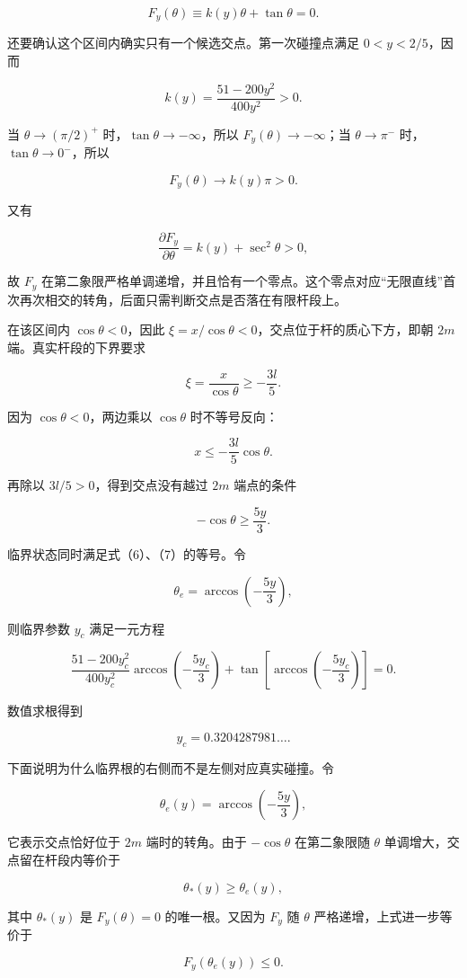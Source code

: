 \documentclass[12pt,a4paper,UTF8]{ctexart}
\begin{document}
\[F_y(\theta)\equiv k(y)\theta+\tan\theta=0. \tag{6}\]

还要确认这个区间内确实只有一个候选交点。第一次碰撞点满足
\(0<y<2/5\)，因而

\[k(y)=\frac{51-200y^2}{400y^2}>0.\]

当 \(\theta\to(\pi/2)^+\) 时，\(\tan\theta\to-\infty\)，所以
\(F_y(\theta)\to-\infty\)；当 \(\theta\to\pi^-\)
时，\(\tan\theta\to0^-\)，所以

\[F_y(\theta)\to k(y)\pi>0.\]

又有

\[\frac{\partial F_y}{\partial\theta}=k(y)+\sec^2\theta>0,\]

故 \(F_y\)
在第二象限严格单调递增，并且恰有一个零点。这个零点对应``无限直线''首次再次相交的转角，后面只需判断交点是否落在有限杆段上。

在该区间内 \(\cos\theta<0\)，因此
\(\xi=x/\cos\theta<0\)，交点位于杆的质心下方，即朝 \(2m\)
端。真实杆段的下界要求

\[\xi=\frac{x}{\cos\theta}\geq-\frac{3l}{5}.\]

因为 \(\cos\theta<0\)，两边乘以 \(\cos\theta\) 时不等号反向：

\[x\leq-\frac{3l}{5}\cos\theta.\]

再除以 \(3l/5>0\)，得到交点没有越过 \(2m\) 端点的条件

\[-\cos\theta\geq\frac{5y}{3}. \tag{7}\]

临界状态同时满足式（6）、（7）的等号。令

\[\theta_e=\arccos\left(-\frac{5y}{3}\right),\]

则临界参数 \(y_c\) 满足一元方程

\[\boxed{
\frac{51-200y_c^2}{400y_c^2}
\arccos\left(-\frac{5y_c}{3}\right)
+\tan\!\left[\arccos\left(-\frac{5y_c}{3}\right)\right]=0
}. \tag{8}\]

数值求根得到

\[y_c=0.3204287981\ldots.\]

下面说明为什么临界根的右侧而不是左侧对应真实碰撞。令

\[\theta_e(y)=\arccos\left(-\frac{5y}{3}\right),\]

它表示交点恰好位于 \(2m\) 端时的转角。由于 \(-\cos\theta\) 在第二象限随
\(\theta\) 单调增大，交点留在杆段内等价于

\[\theta_*(y)\geq\theta_e(y),\]

其中 \(\theta_*(y)\) 是 \(F_y(\theta)=0\) 的唯一根。又因为 \(F_y\) 随
\(\theta\) 严格递增，上式进一步等价于

\[F_y\!\left(\theta_e(y)\right)\leq0.\]
\end{document}
